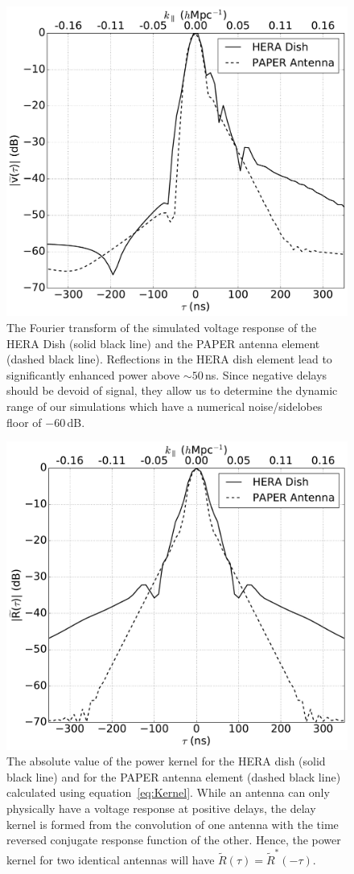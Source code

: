\documentclass[twocolumn]{emulateapj}
\begin{document}
\begin{figure}[h!]
\includegraphics[width=.5\textwidth]{figures/compare_simulations_paper.pdf}
\caption{The Fourier transform of the simulated voltage response of the HERA Dish (solid black line) and the PAPER antenna element (dashed black line). Reflections in the HERA dish element lead to significantly enhanced power above $\sim 50$\,ns. Since negative delays should be devoid of signal, they allow us to determine the dynamic range of our simulations which have a numerical noise/sidelobes floor of $-60$\,dB.}
\label{fig:SimulationResults}
\end{figure}



\begin{figure}[h!]
\includegraphics[width=.5\textwidth]{figures/compare_kernels_paper.pdf}
\caption{The absolute value of the power kernel for the HERA dish (solid black line) and for the PAPER antenna element (dashed black line) calculated using equation~\ref{eq:Kernel}. While an antenna can only physically have a voltage response at positive delays, the delay kernel is formed from the convolution of one antenna with the time reversed conjugate response function of the other. Hence, the power kernel for two identical antennas will have $\widetilde{R}(\tau) = \widetilde{R}^*(-\tau)$.}
\label{fig:Kernels}
\end{figure}
\end{document}
